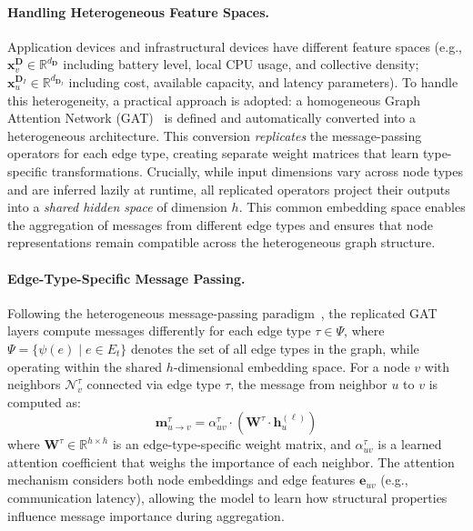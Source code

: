 \paragraph{Handling Heterogeneous Feature Spaces.}
Application devices and infrastructural devices have different feature spaces 
 (e.g., $\mathbf{x}^{\mathbf{D}}_v \in \mathbb{R}^{d_{\mathbf{D}}}$ including battery level, local CPU usage, and collective density; 
 $\mathbf{x}^{\mathbf{D}_I}_u \in \mathbb{R}^{d_{\mathbf{D}_I}}$ including cost, available capacity, and latency parameters).
%
To handle this heterogeneity, 
 a practical approach is adopted: 
 a homogeneous Graph Attention Network (GAT)~\cite{DBLP:journals/corr/abs-1710-10903} 
 is defined and automatically converted into a heterogeneous architecture.
%
This conversion \emph{replicates} the message-passing operators for each edge type, 
 creating separate weight matrices that learn type-specific transformations.
%
Crucially, 
 while input dimensions vary across node types and are inferred lazily at runtime,
 all replicated operators project their outputs into a \emph{shared hidden space} of dimension $h$.
%
This common embedding space enables the aggregation of messages from different edge types
 and ensures that node representations remain compatible across the heterogeneous graph structure.


\paragraph{Edge-Type-Specific Message Passing.}
Following the heterogeneous message-passing paradigm~\cite{DBLP:conf/www/WangJSWYCY19}, 
 the replicated GAT layers compute messages differently for each edge type $\tau \in \Psi$,
 where $\Psi = \{\psi(e) \mid e \in E_t\}$ denotes the set of all edge types in the graph,
 while operating within the shared $h$-dimensional embedding space.
%
For a node $v$ with neighbors $\mathcal{N}^\tau_v$ connected via edge type $\tau$, 
 the message from neighbor $u$ to $v$ is computed as:
\begin{equation}\label{eq:message}
    \mathbf{m}^\tau_{u \to v} = \alpha^\tau_{uv} \cdot \left( \mathbf{W}^\tau \cdot \mathbf{h}^{(\ell)}_u \right)
\end{equation}
 where $\mathbf{W}^\tau \in \mathbb{R}^{h \times h}$ is an edge-type-specific weight matrix, 
 and $\alpha^\tau_{uv}$ is a learned attention coefficient that weighs the importance of each neighbor.
%
The attention mechanism considers both node embeddings and edge features $\mathbf{e}_{uv}$ (e.g., communication latency),
 allowing the model to learn how structural properties influence message importance during aggregation.

